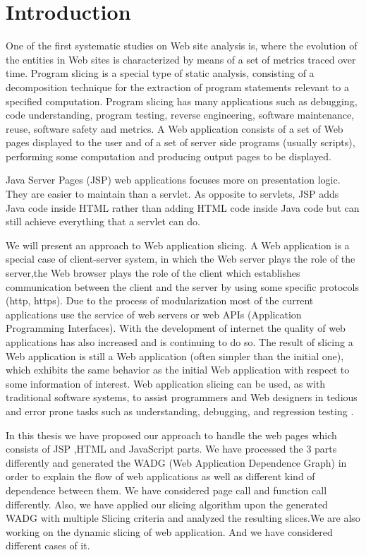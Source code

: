 \documentclass[11pt]{article}   %
\begin{document}
\section{Introduction}
\par One of the first systematic studies on Web site analysis is, where the evolution of the entities in Web sites is characterized by means of a set of metrics traced over time.
Program slicing is a special type of static analysis, consisting of a decomposition technique for the extraction of program statements relevant to a specified computation. Program slicing has many applications such as debugging, code understanding, program testing, reverse engineering, software maintenance, reuse, software safety and metrics. A Web application consists of a set of Web pages displayed to the user and of a set of server side programs (usually scripts), performing some computation and producing output pages to be displayed.
\par Java Server Pages (JSP) web applications focuses more on presentation logic. They are easier to maintain than a servlet. As opposite to servlets, JSP adds Java code inside HTML rather than adding HTML code inside Java code but can still achieve everything that a servlet can do.
\par We will present an approach to Web application slicing. A Web application is a special case of client-server system, in which the Web server plays the role of the server,the Web browser plays the role of the client which establishes communication between the client and the server by using some specific protocols (http, https). Due to the process of modularization most of the current applications use the service of web servers or web APIs (Application Programming Interfaces). With the development of internet the quality of web applications has also increased and is continuing to do so. The result of slicing a Web application is still a Web application (often simpler than the initial one), which exhibits the same behavior as the initial Web application with respect to some information of interest. Web application slicing can be used, as with traditional software systems, to assist programmers and Web designers in tedious and error prone tasks such as understanding, debugging, and regression testing \cite{tsai2001scenario}\cite{masri2004detecting}\cite{xu2003regression}.\cite{wu2004slicing}
\par In this thesis we have proposed our approach to handle the web pages which consists of JSP ,HTML and JavaScript parts. We have processed the 3 parts differently and generated the WADG (Web Application Dependence Graph) in order to explain the flow of web applications  as well as different kind of dependence between them. We have considered page call and function call differently. Also, we have applied our slicing algorithm upon the generated WADG with multiple Slicing criteria and analyzed the resulting slices.We are also working on the dynamic slicing of web application. And we have considered different cases of  it.
\end{document}
